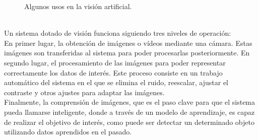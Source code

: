 \begin{figure}[h!]
  \begin{center}
    \hspace{8mm}
    \hspace{8mm}
  \end{center}
\caption[]{Algunos usos en la visión artificial.\footnotemark} \label{fig:vision}
\end{figure}\\
Un sistema dotado de visión funciona siguiendo tres niveles de operación:\\
En primer lugar, la obtención de imágenes o vídeos mediante una cámara. Estas imágenes son transferidas al sistema para poder procesarlas posteriormente. En segundo lugar, el procesamiento de las imágenes para poder representar correctamente los datos de interés. Este proceso consiste en un trabajo automático del sistema en el que se elimina el ruido, reescalar, ajustar el contraste y otros ajustes para adaptar las imágenes.\\ Finalmente, la comprensión de imágenes, que es el paso clave para que el sistema pueda llamarse inteligente, donde a través de un modelo de aprendizaje, es capaz de realizar el objetivo de interés, como puede ser detectar un determinado objeto utilizando datos aprendidos en el pasado.\\
